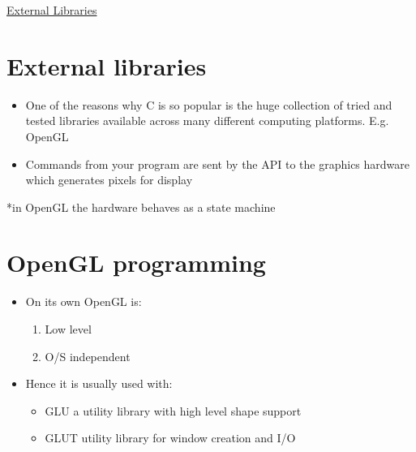 \documentclass{article}
\begin{document}
	
\begin{center}
	\underline{\huge External Libraries}
\end{center}	
	


\section{External libraries}
\begin{itemize}
\item One of the reasons why C is so popular is the huge collection of tried and tested libraries available across many different computing platforms.  E.g.  OpenGL
\end{itemize}

\begin{center}
\end{center}

\begin{itemize}
\item Commands from your program are sent by the API to the graphics hardware which generates pixels for display
\end{itemize}
*in OpenGL the hardware behaves as a state machine


\section{OpenGL programming}
\begin{itemize}
\item On its own OpenGL is:
\begin{enumerate}
\item Low level
\item O/S independent
\end{enumerate}
\item Hence it is usually used with:
\begin{itemize}
\item GLU a utility library with high level shape support
\item GLUT utility library for window creation and I/O
\end{itemize}
\end{itemize}
\end{document}
